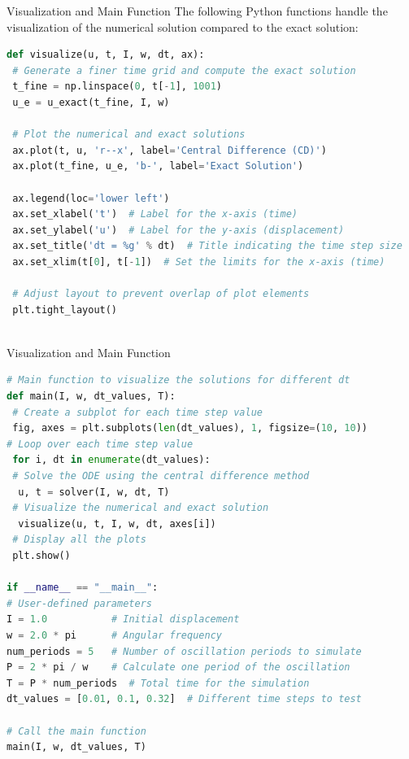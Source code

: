 \documentclass[10pt, aspectratio=54]{beamer}
\begin{document}
\begin{frame}[fragile]{Visualization and Main Function}
	\justifying
	The following Python functions handle the visualization of the numerical solution compared to the exact solution:
	
	\begin{lstlisting}[language=Python]
def visualize(u, t, I, w, dt, ax):
 # Generate a finer time grid and compute the exact solution 
 t_fine = np.linspace(0, t[-1], 1001)
 u_e = u_exact(t_fine, I, w)
 	
 # Plot the numerical and exact solutions
 ax.plot(t, u, 'r--x', label='Central Difference (CD)')
 ax.plot(t_fine, u_e, 'b-', label='Exact Solution')
	
 ax.legend(loc='lower left')
 ax.set_xlabel('t')  # Label for the x-axis (time)
 ax.set_ylabel('u')  # Label for the y-axis (displacement)
 ax.set_title('dt = %g' % dt)  # Title indicating the time step size
 ax.set_xlim(t[0], t[-1])  # Set the limits for the x-axis (time)
	
 # Adjust layout to prevent overlap of plot elements
 plt.tight_layout()
		
	\end{lstlisting}
\end{frame}

\begin{frame}[fragile]{Visualization and Main Function}
	
	\begin{lstlisting}[language=Python]
# Main function to visualize the solutions for different dt
def main(I, w, dt_values, T):
 # Create a subplot for each time step value
 fig, axes = plt.subplots(len(dt_values), 1, figsize=(10, 10))
# Loop over each time step value
 for i, dt in enumerate(dt_values):
 # Solve the ODE using the central difference method
  u, t = solver(I, w, dt, T)
 # Visualize the numerical and exact solution
  visualize(u, t, I, w, dt, axes[i])
 # Display all the plots
 plt.show()
 
if __name__ == "__main__":
# User-defined parameters
I = 1.0           # Initial displacement
w = 2.0 * pi      # Angular frequency
num_periods = 5   # Number of oscillation periods to simulate
P = 2 * pi / w    # Calculate one period of the oscillation
T = P * num_periods  # Total time for the simulation
dt_values = [0.01, 0.1, 0.32]  # Different time steps to test

# Call the main function 
main(I, w, dt_values, T)
		
	\end{lstlisting}
\end{frame}
\end{document}
